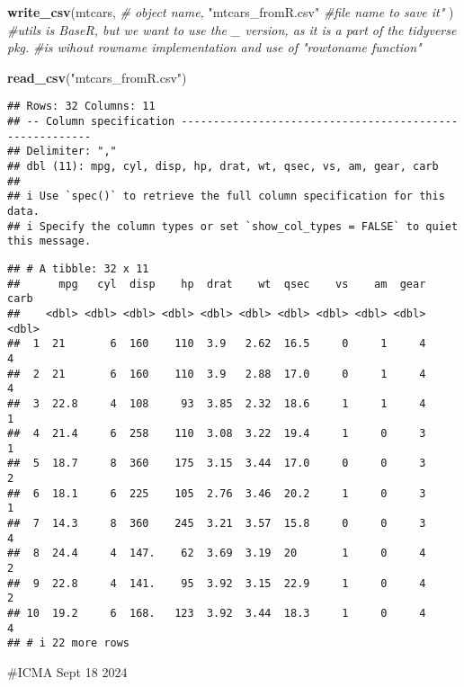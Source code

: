 \documentclass[
]{article}
\newenvironment{Shaded}{\begin{snugshade}}{\end{snugshade}}
\newcommand{\CommentTok}[1]{\textcolor[rgb]{0.56,0.35,0.01}{\textit{#1}}}
\newcommand{\FunctionTok}[1]{\textcolor[rgb]{0.13,0.29,0.53}{\textbf{#1}}}
\newcommand{\NormalTok}[1]{#1}
\newcommand{\StringTok}[1]{\textcolor[rgb]{0.31,0.60,0.02}{#1}}
\begin{document}
\begin{Shaded}
\begin{Highlighting}[]
\FunctionTok{write\_csv}\NormalTok{(mtcars, }\CommentTok{\# object name, }
         \StringTok{"mtcars\_fromR.csv"} \CommentTok{\#file name to save it"}
\NormalTok{         )}
\CommentTok{\#utils is BaseR, but we want to use the \_ version, as it is a part of the tidyverse pkg.}
\CommentTok{\#is wihout rowname implementation and use of "rowtoname function"}
\end{Highlighting}
\end{Shaded}

\begin{Shaded}
\begin{Highlighting}[]
\FunctionTok{read\_csv}\NormalTok{(}\StringTok{"mtcars\_fromR.csv"}\NormalTok{)}
\end{Highlighting}
\end{Shaded}

\begin{verbatim}
## Rows: 32 Columns: 11
## -- Column specification --------------------------------------------------------
## Delimiter: ","
## dbl (11): mpg, cyl, disp, hp, drat, wt, qsec, vs, am, gear, carb
## 
## i Use `spec()` to retrieve the full column specification for this data.
## i Specify the column types or set `show_col_types = FALSE` to quiet this message.
\end{verbatim}

\begin{verbatim}
## # A tibble: 32 x 11
##      mpg   cyl  disp    hp  drat    wt  qsec    vs    am  gear  carb
##    <dbl> <dbl> <dbl> <dbl> <dbl> <dbl> <dbl> <dbl> <dbl> <dbl> <dbl>
##  1  21       6  160    110  3.9   2.62  16.5     0     1     4     4
##  2  21       6  160    110  3.9   2.88  17.0     0     1     4     4
##  3  22.8     4  108     93  3.85  2.32  18.6     1     1     4     1
##  4  21.4     6  258    110  3.08  3.22  19.4     1     0     3     1
##  5  18.7     8  360    175  3.15  3.44  17.0     0     0     3     2
##  6  18.1     6  225    105  2.76  3.46  20.2     1     0     3     1
##  7  14.3     8  360    245  3.21  3.57  15.8     0     0     3     4
##  8  24.4     4  147.    62  3.69  3.19  20       1     0     4     2
##  9  22.8     4  141.    95  3.92  3.15  22.9     1     0     4     2
## 10  19.2     6  168.   123  3.92  3.44  18.3     1     0     4     4
## # i 22 more rows
\end{verbatim}

\#ICMA Sept 18 2024
\end{document}
